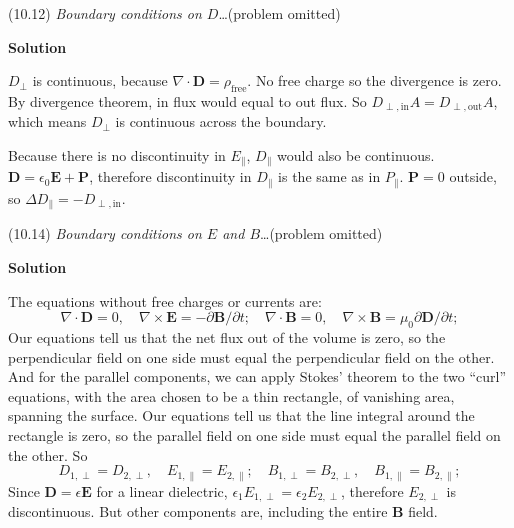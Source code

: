 \documentclass{article}
\begin{document}

\begin{homeworkProblem}
	(10.12) \textit{Boundary conditions on $D$}\ldots (problem omitted)

	\textbf{Solution}

	$D_\perp$ is continuous, because $\nabla\cdot\mathbf{D}=\rho_\mathrm{free}$. No free charge so the divergence is zero. By divergence theorem, in flux would equal to out flux. So $D_{\perp,\mathrm{in}}A=D_{\perp,\mathrm{out}}A$, which means $D_\perp$ is continuous across the boundary.

	Because there is no discontinuity in $E_\parallel$, $D_\parallel$ would also be continuous. $\mathbf{D}=\epsilon_0\mathbf{E}+\mathbf{P}$, therefore discontinuity in $D_\parallel$ is the same as in $P_\parallel$. $\mathbf{P}=0$ outside, so $\Delta D_\parallel=-D_{\perp,\mathrm{in}}$.
\end{homeworkProblem}


\begin{homeworkProblem}
	(10.14) \textit{Boundary conditions on $E$ and $B$}\ldots (problem omitted)

	\textbf{Solution}

	The equations without free charges or currents are:
	\[
		\nabla\cdot\mathbf{D}=0,\quad\nabla\times\mathbf{E}=-\partial\mathbf{B}/\partial t;\quad
		\nabla\cdot\mathbf{B}=0,\quad\nabla\times\mathbf{B}=\mu_0\partial\mathbf{D}/\partial t;
	\]
	Our equations tell us that the net flux out of the volume is zero, so the perpendicular field on one side must equal the perpendicular field on the other. And for the parallel components, we can apply Stokes' theorem to the two ``curl'' equations, with the area chosen to be a thin rectangle, of vanishing area, spanning the surface. Our equations tell us that the line integral around the rectangle is zero, so the parallel field on one side must equal the parallel field on the other. So
	\[
		D_{1,\perp}=D_{2,\perp},\quad E_{1,\parallel}=E_{2,\parallel};\quad
		B_{1,\perp}=B_{2,\perp},\quad B_{1,\parallel}=B_{2,\parallel};
	\]
	Since $\mathbf{D}=\epsilon\mathbf{E}$ for a linear dielectric, $\epsilon_1E_{1,\perp}=\epsilon_2E_{2,\perp}$, therefore $E_{2,\perp}$ is discontinuous. But other components are, including the entire $\mathbf{B}$ field.
\end{homeworkProblem}
\end{document}
